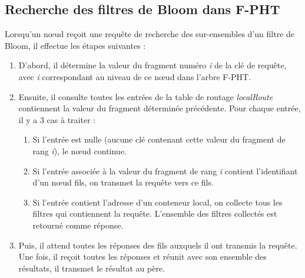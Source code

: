 \documentclass[a4paper,11pt]{report}
\begin{document}
\subsection{Recherche des filtres de Bloom dans F-PHT}
	Lorsqu'un nœud reçoit une requête de recherche des sur-ensembles d'un filtre de Bloom, il effectue les étapes suivantes :
	\begin{enumerate}
		\item D'abord, il détermine la valeur du fragment numéro \textit{i} de la clé de requête, avec \textit{i} correspondant au niveau de ce nœud dans l'arbre F-PHT.
		\item Ensuite, il consulte toutes les entrées de la table de routage \textit{localRoute} contiennent la valeur du fragment déterminée précédente. Pour chaque entrée, il y a 3 cas à traiter :
		\begin{enumerate}
			\item Si l'entrée est nulle (aucune clé contenant cette valeur du fragment de rang \textit{i}), le nœud continue.
			\item Si l'entrée associée à la valeur du fragment de rang \textit{i} contient l'identifiant d'un nœud fils, on transmet la requête vers ce fils.
			\item Si l'entrée contient l'adresse d'un conteneur local, on collecte tous les filtres qui contiennent la requête. L'ensemble des filtres collectés est retourné comme réponse.
		\end{enumerate}
		\item Puis, il attend toutes les réponses des fils auxquels il ont transmis la requête. Une fois, il reçoit toutes les réponses et réunit avec son ensemble des résultats, il transmet le résultat au père.
	\end{enumerate}
	
\end{document}
